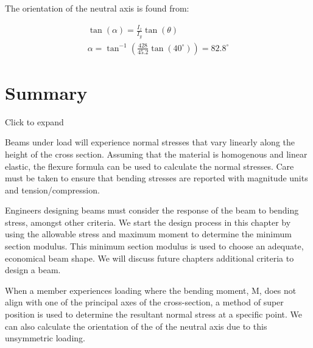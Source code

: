 \documentclass[
  letterpaper,
  DIV=11,
  numbers=noendperiod]{scrreprt}
\begin{document}
\begin{tcolorbox}
The orientation of the neutral axis is found from:

\[
\begin{gathered}
\tan (\alpha)=\frac{I_z}{I_y} \tan (\theta) \\
\alpha=\tan ^{-1}\left(\frac{428}{45.2} \tan \left(40^{\circ}\right)\right)=82.8^{\circ}
\end{gathered}
\]

\end{tcolorbox}

\section{Summary}\label{summary-4}

Click to expand

\begin{tcolorbox}[enhanced jigsaw, colback=white, colframe=quarto-callout-note-color-frame, leftrule=.75mm, opacitybacktitle=0.6, colbacktitle=quarto-callout-note-color!10!white, arc=.35mm, bottomrule=.15mm, breakable, title={Key takeaways}, left=2mm, titlerule=0mm, toptitle=1mm, toprule=.15mm, opacityback=0, rightrule=.15mm, coltitle=black, bottomtitle=1mm]

Beams under load will experience normal stresses that vary linearly
along the height of the cross section. Assuming that the material is
homogenous and linear elastic, the flexure formula can be used to
calculate the normal stresses. Care must be taken to ensure that bending
stresses are reported with magnitude units and tension/compression.

Engineers designing beams must consider the response of the beam to
bending stress, amongst other criteria. We start the design process in
this chapter by using the allowable stress and maximum moment to
determine the minimum section modulus. This minimum section modulus is
used to choose an adequate, economical beam shape. We will discuss
future chapters additional criteria to design a beam.

When a member experiences loading where the bending moment, M, does not
align with one of the principal axes of the cross-section, a method of
super position is used to determine the resultant normal stress at a
specific point. We can also calculate the orientation of the of the
neutral axis due to this unsymmetric loading.

\end{tcolorbox}
\end{document}
